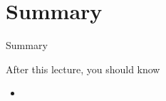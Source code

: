 \documentclass[12pt,t]{beamer}
\begin{document}
\section{Summary}
\begin{frame}{Summary}
\begin{block}{After this lecture, you should know}
\begin{itemize}
\item 
\end{itemize}
\end{block}
\end{frame}
\end{document}
